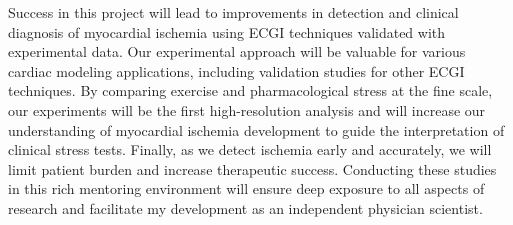 Success in this project will lead to improvements
in detection and clinical diagnosis of myocardial ischemia using ECGI
techniques validated with experimental data. Our experimental
approach will be valuable for various cardiac modeling applications,
including validation studies for other ECGI techniques. By comparing
exercise and pharmacological stress at the fine scale, our experiments will be the first high-resolution analysis and will increase our understanding of myocardial ischemia development
to guide the
interpretation of clinical stress tests. Finally, as we detect ischemia
early and accurately, we will limit patient burden and increase therapeutic
success.  Conducting these studies in this rich
mentoring environment will ensure deep exposure to all aspects of research
and facilitate my development as an independent physician scientist.




%



